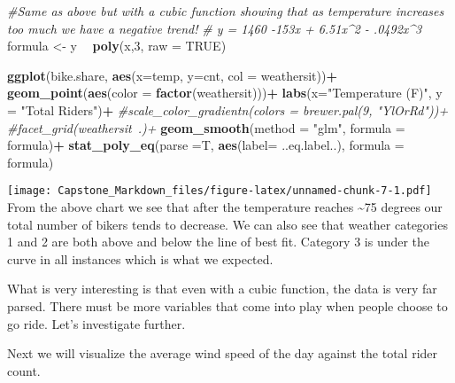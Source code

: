 \documentclass[]{article}
\newenvironment{Shaded}{\begin{snugshade}}{\end{snugshade}}
\newcommand{\KeywordTok}[1]{\textcolor[rgb]{0.13,0.29,0.53}{\textbf{#1}}}
\newcommand{\DataTypeTok}[1]{\textcolor[rgb]{0.13,0.29,0.53}{#1}}
\newcommand{\DecValTok}[1]{\textcolor[rgb]{0.00,0.00,0.81}{#1}}
\newcommand{\StringTok}[1]{\textcolor[rgb]{0.31,0.60,0.02}{#1}}
\newcommand{\CommentTok}[1]{\textcolor[rgb]{0.56,0.35,0.01}{\textit{#1}}}
\newcommand{\OtherTok}[1]{\textcolor[rgb]{0.56,0.35,0.01}{#1}}
\newcommand{\OperatorTok}[1]{\textcolor[rgb]{0.81,0.36,0.00}{\textbf{#1}}}
\newcommand{\NormalTok}[1]{#1}
\begin{document}
\begin{Shaded}
\begin{Highlighting}[]
\CommentTok{#Same as above but with a cubic function showing that as temperature increases too much we have a negative trend!}
\CommentTok{# y = 1460 -153x + 6.51x^2 - .0492x^3}
\NormalTok{formula <-}\StringTok{ }\NormalTok{y }\OperatorTok{~}\StringTok{ }\KeywordTok{poly}\NormalTok{(x,}\DecValTok{3}\NormalTok{, }\DataTypeTok{raw =} \OtherTok{TRUE}\NormalTok{)}

\KeywordTok{ggplot}\NormalTok{(bike.share, }\KeywordTok{aes}\NormalTok{(}\DataTypeTok{x=}\NormalTok{temp, }\DataTypeTok{y=}\NormalTok{cnt, }\DataTypeTok{col =}\NormalTok{ weathersit))}\OperatorTok{+}
\StringTok{  }\KeywordTok{geom_point}\NormalTok{(}\KeywordTok{aes}\NormalTok{(}\DataTypeTok{color =} \KeywordTok{factor}\NormalTok{(weathersit)))}\OperatorTok{+}
\StringTok{  }\KeywordTok{labs}\NormalTok{(}\DataTypeTok{x=}\StringTok{"Temperature (F)"}\NormalTok{, }\DataTypeTok{y =} \StringTok{"Total Riders"}\NormalTok{)}\OperatorTok{+}
\StringTok{  }\CommentTok{#scale_color_gradientn(colors = brewer.pal(9, "YlOrRd"))+}
\StringTok{  }\CommentTok{#facet_grid(weathersit~.)+}
\StringTok{  }\KeywordTok{geom_smooth}\NormalTok{(}\DataTypeTok{method =} \StringTok{"glm"}\NormalTok{, }\DataTypeTok{formula =}\NormalTok{ formula)}\OperatorTok{+}
\StringTok{  }\KeywordTok{stat_poly_eq}\NormalTok{(}\DataTypeTok{parse =}\NormalTok{T, }\KeywordTok{aes}\NormalTok{(}\DataTypeTok{label=}\NormalTok{ ..eq.label..), }\DataTypeTok{formula =}\NormalTok{ formula)}
\end{Highlighting}
\end{Shaded}

\texttt{[image: Capstone\_Markdown\_files/figure-latex/unnamed-chunk-7-1.pdf]}
From the above chart we see that after the temperature reaches
\textasciitilde{}75 degrees our total number of bikers tends to
decrease. We can also see that weather categories 1 and 2 are both above
and below the line of best fit. Category 3 is under the curve in all
instances which is what we expected.

What is very interesting is that even with a cubic function, the data is
very far parsed. There must be more variables that come into play when
people choose to go ride. Let's investigate further.

Next we will visualize the average wind speed of the day against the
total rider count.
\end{document}
